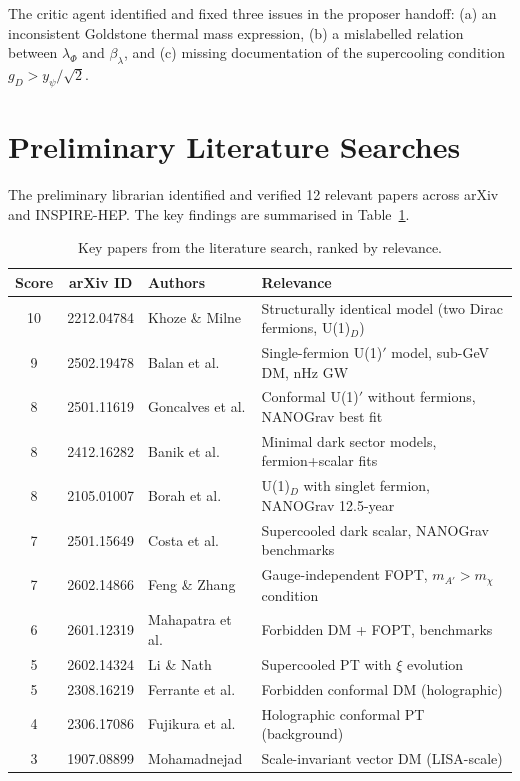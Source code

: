 \documentclass[12pt,a4paper]{article}
\begin{document}
The critic agent identified and fixed three issues in the proposer handoff: (a) an inconsistent Goldstone thermal mass expression, (b) a mislabelled relation between $\lambda_\Phi$ and $\beta_\lambda$, and (c) missing documentation of the supercooling condition $g_D > y_\psi/\sqrt{2}$.

\section{Preliminary Literature Searches}
\label{sec:literature}

The preliminary librarian identified and verified 12 relevant papers across arXiv and INSPIRE-HEP. The key findings are summarised in Table~\ref{tab:papers}.

\begin{table}[H]
\centering
\caption{Key papers from the literature search, ranked by relevance.}
\label{tab:papers}
\small
\begin{tabular}{ccll}
\toprule
Score & arXiv ID & Authors & Relevance \\
\midrule
10 & 2212.04784 & Khoze \& Milne & Structurally identical model (two Dirac fermions, U(1)$_D$) \\
9 & 2502.19478 & Balan et al. & Single-fermion U(1)$'$ model, sub-GeV DM, nHz GW \\
8 & 2501.11619 & Goncalves et al. & Conformal U(1)$'$ without fermions, NANOGrav best fit \\
8 & 2412.16282 & Banik et al. & Minimal dark sector models, fermion+scalar fits \\
8 & 2105.01007 & Borah et al. & U(1)$_D$ with singlet fermion, NANOGrav 12.5-year \\
7 & 2501.15649 & Costa et al. & Supercooled dark scalar, NANOGrav benchmarks \\
7 & 2602.14866 & Feng \& Zhang & Gauge-independent FOPT, $m_{A'} > m_\chi$ condition \\
6 & 2601.12319 & Mahapatra et al. & Forbidden DM + FOPT, benchmarks \\
5 & 2602.14324 & Li \& Nath & Supercooled PT with $\xi$ evolution \\
5 & 2308.16219 & Ferrante et al. & Forbidden conformal DM (holographic) \\
4 & 2306.17086 & Fujikura et al. & Holographic conformal PT (background) \\
3 & 1907.08899 & Mohamadnejad & Scale-invariant vector DM (LISA-scale) \\
\bottomrule
\end{tabular}
\end{table}
\end{document}
